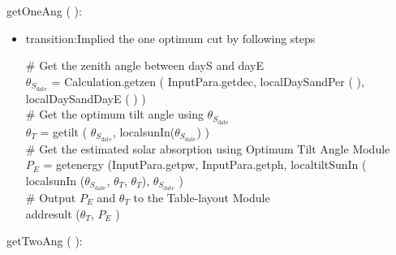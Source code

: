 \documentclass[12pt, titlepage]{article}
\begin{document}
\noindent  getOneAng ( ):

\begin{itemize}
\item transition:Implied the one optimum cut by following steps


$\#$ Get the zenith angle between dayS and
dayE\\
$\theta_{S_{\text{date}}}$ = Calculation.getzen ( InputPara.getdec,   localDaySandPer ( ),  localDaySandDayE ( ) )\\

$\#$ Get the optimum tilt angle using $\theta_{S_{\text{date}}}$\\
$\theta_{T}$ = getilt ( $\theta_{S_{\text{date}}}$, localsunIn($\theta_{S_{\text{date}}}$) )\\


$\#$ Get the estimated solar absorption using Optimum Tilt Angle Module\\

$P_{E}$ = getenergy (InputPara.getpw, InputPara.getph, localtiltSunIn ( localsunIn ($\theta_{S_{\text{date}}}$, $\theta_{T}$, $\theta_{T}$), $\theta_{S_{\text{date}}}$ )\\

$\#$ Output $P_{E}$ and $\theta_{T}$ to the Table-layout Module\\
addresult ($\theta_{T}$, $P_{E}$ )\\



\end{itemize}

\noindent  getTwoAng ( ):
\end{document}
